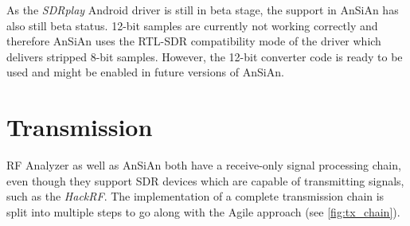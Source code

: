 As the \emph{SDRplay} Android driver is still in beta stage, the support in AnSiAn has
also still beta status. 12-bit samples are currently not working correctly and
therefore \ac{AnSiAn} uses the RTL-SDR compatibility mode of the driver which
delivers stripped 8-bit samples. However, the 12-bit converter code is ready to
be used and might be enabled in future versions of \ac{AnSiAn}.


\section{Transmission}

RF Analyzer as well as \ac{AnSiAn} both have a receive-only signal processing
chain, even though they support \ac{SDR} devices which are capable of transmitting
signals, such as the \emph{HackRF}.
The implementation of a complete transmission chain is split into multiple steps
to go along with the Agile approach (see \autoref{fig:tx_chain}).

